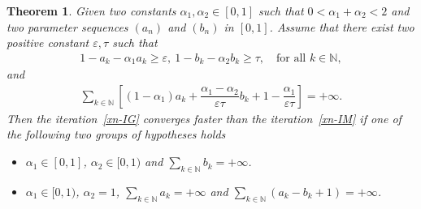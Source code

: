 \documentclass[a4paper, 11pt]{article}
\newtheorem{theorem}{Theorem}[section]
\begin{document}
\begin{theorem}\label{theo-IG-and-IM}
Given two constants $\alpha_1,\alpha_2 \in [0,1]$ such that $0<\alpha_1+\alpha_2<2$ and two parameter sequences $(a_n)$ and $(b_n)$ in $[0,1]$. Assume that there exist two positive constant $\varepsilon, \tau$ such that
\begin{align}\label{cond:IG-IM-1}
	1-a_k-\alpha_1a_k \ge \varepsilon,\ 1-b_k-\alpha_2b_k \ge \tau, \quad \text{for all } k \in \mathbb{N},
\end{align}
and 
\begin{align}\label{cond:IG-IM-2}
	\displaystyle\sum_{k \in \mathbb{N}}{\left[(1-\alpha_1)a_k+\dfrac{\alpha_1-\alpha_2}{\varepsilon\tau}b_k+1-\displaystyle\dfrac{\alpha_1}{\varepsilon\tau}\right]}=+\infty.
\end{align}
Then the iteration~\eqref{xn-IG} converges faster than the iteration~\eqref{xn-IM} if one of the following two groups of hypotheses holds 
\begin{itemize}
\item[i)] $\alpha_1 \in [0,1]$, $\alpha_2 \in [0,1)$ and $\displaystyle\sum_{k \in \mathbb{N}}{b_k}=+\infty$.
\item[ii)] $\alpha_1 \in [0,1)$, $\alpha_2=1$, $\displaystyle\sum_{k \in \mathbb{N}}a_k=+\infty$ and $\displaystyle\sum_{k \in \mathbb{N}}(a_k-b_k+1)=+\infty$.
\end{itemize}
\end{theorem}
\end{document}
